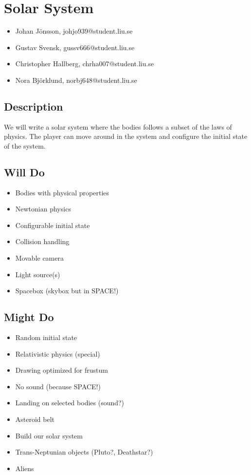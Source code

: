 \documentclass{article}
\begin{document}
\section*{Solar System}
\begin{itemize}
        \item Johan J\"onsson, johjo939@student.liu.se
        \item Gustav Svensk, gussv666@student.liu.se
        \item Christopher Hallberg, chrha007@student.liu.se
        \item Nora Bj\"orklund, norbj648@student.liu.se
\end{itemize}

\subsection*{Description}
We will write a solar system where the bodies follows a subset of the laws of 
physics. The player can move around in the system and configure the initial
state of the system.

\subsection*{Will Do}
\begin{itemize}
        \item Bodies with physical properties
        \item Newtonian physics
        \item Configurable initial state
        \item Collision handling
        \item Movable camera
        \item Light source(s)
        \item Spacebox (skybox but in SPACE!)
\end{itemize}

\subsection*{Might Do}
\begin{itemize}
        \item Random initial state
        \item Relativistic physics (special)
        \item Drawing optimized for frustum
        \item No sound (because SPACE!)
        \item Landing on selected bodies (sound?)
        \item Asteroid belt
        \item Build our solar system
        \item Trans-Neptunian objects (Pluto?, Deathstar?)
        \item Aliens
\end{itemize}
\end{document}
